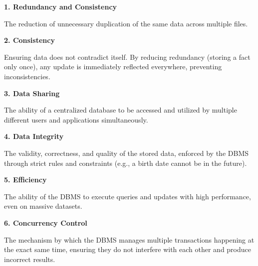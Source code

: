 \vspace{0.3cm}
\textbf{1. Redundancy and Consistency}

The reduction of unnecessary duplication of the same data across multiple files.


\vspace{0.3cm}
\textbf{2. Consistency}

Ensuring data does not contradict itself. By reducing redundancy (storing a fact only once), any update is immediately reflected everywhere, preventing inconsistencies.

\vspace{0.3cm}
\textbf{3. Data Sharing}

The ability of a centralized database to be accessed and utilized by multiple different users and applications simultaneously.

\vspace{0.3cm}
\textbf{4. Data Integrity}

The validity, correctness, and quality of the stored data, enforced by the DBMS through strict rules and constraints (e.g., a birth date cannot be in the future).

\vspace{0.3cm}
\textbf{5. Efficiency}

The ability of the DBMS to execute queries and updates with high performance, even on massive datasets.

\vspace{0.3cm}
\textbf{6. Concurrency Control}

The mechanism by which the DBMS manages multiple transactions happening at the exact same time, ensuring they do not interfere with each other and produce incorrect results.
